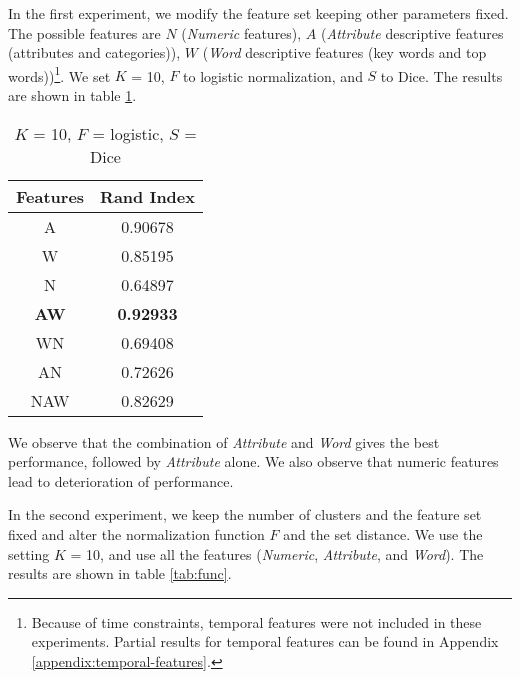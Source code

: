 \documentclass{article}
\begin{document}
In the first experiment, we modify the feature set keeping other parameters fixed.
The possible features are $N$ (\textit{Numeric} features), $A$ (\textit{Attribute} descriptive features (attributes and categories)), $W$ (\textit{Word} descriptive features (key words and top words))\footnote{Because of time constraints, temporal features were not included in these experiments. Partial results for temporal features can be found in Appendix \ref{appendix:temporal-features}.}.
We set $K$ = 10, $F$ to logistic normalization, and $S$ to Dice.
The results are shown in table \ref{tab:feature}.

\begin{table}
   \begin{center}
      \begin{tabular}{| c | c |}
         \hline
            Features & Rand Index \\
         \hline
            A & 0.90678 \\
            W & 0.85195 \\
            N & 0.64897 \\
            \textbf{AW} & \textbf{0.92933}\\
            WN & 0.69408 \\
            AN & 0.72626 \\
            NAW & 0.82629 \\
         \hline
      \end{tabular}
      \caption{$K$ = 10, $F$ = logistic, $S$ = Dice}
      \label{tab:feature}
   \end{center}
\end{table}

We observe that the combination of \textit{Attribute} and \textit{Word} gives the best performance, followed by \textit{Attribute} alone.
We also observe that numeric features lead to deterioration of performance.

In the second experiment, we keep the number of clusters and the feature set fixed and alter the normalization function $F$ and the set distance.
We use the setting $K$ = 10, and use all the features (\textit{Numeric}, \textit{Attribute}, and \textit{Word}).
The results are shown in table \ref{tab:func}. 
\end{document}

